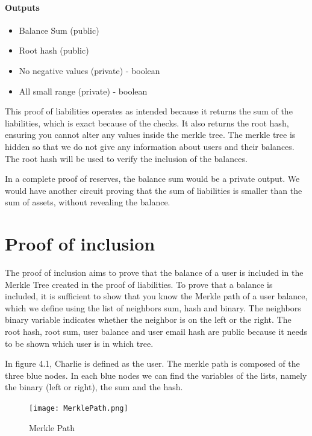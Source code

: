 \paragraph{Outputs}
\begin{itemize}
   \item Balance Sum (public)
   \item Root hash (public)
   \item No negative values (private) - boolean
   \item All small range (private) - boolean
   \end{itemize}

This proof of liabilities operates as intended because it returns the sum of the liabilities, which is exact because of the checks.
It also returns the root hash, ensuring you cannot alter any values inside the merkle tree. The merkle tree is hidden so that we do not
give any information about users and their balances.
The root hash will be used to verify the inclusion of the balances.

In a complete proof of reserves, the balance sum would be a private output. We would have another circuit proving that the sum of liabilities is smaller
than the sum of assets, without revealing the balance.

\section{Proof of inclusion}
\label{subsec:pi}
The proof of inclusion aims to prove that the balance of a user is included in the Merkle Tree created in the proof of liabilities.
To prove that a balance is included, it is sufficient to show that you know the Merkle path of a user balance,
which we define using the list of neighbors sum, hash and binary.
The neighbors binary variable indicates whether the neighbor is on the left or the right.
The root hash, root sum, user balance and user email hash are public because it needs to be shown which user is in which tree.

In figure 4.1, Charlie is defined as the user. The merkle path is composed of the three blue nodes. In each blue nodes we can find the variables of the lists,
namely the binary (left or right), the sum and the hash.
\begin{figure}[H]
   \centering
   \texttt{[image: MerklePath.png]}
   \caption{Merkle Path \cite{BM22}}
   \label{overflow}
   \end{figure}



